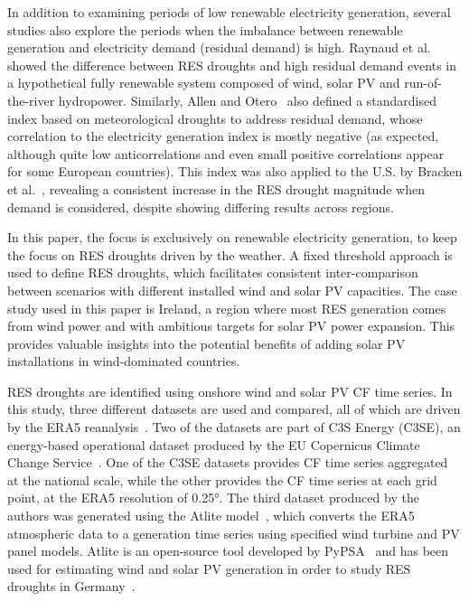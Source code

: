 \documentclass[preprint, 12pt]{elsarticle}
\begin{document}
In addition to examining periods of low renewable electricity generation, several studies also explore the periods when the imbalance between renewable generation and electricity demand (residual demand) is high. Raynaud et al.~\citep{raynaud2018drought} showed the difference between RES droughts and high residual demand events in a hypothetical fully renewable system composed of wind, solar PV and run-of-the-river hydropower. Similarly, Allen and Otero~\citep{allen2023drought} also defined a standardised index based on meteorological droughts to address residual demand, whose correlation to the electricity generation index is mostly negative (as expected, although quite low anticorrelations and even small positive correlations appear for some European countries). This index was also applied to the U.S. by Bracken et al.~\citep{bracken2024drought}, revealing a consistent increase in the RES drought magnitude when demand is considered, despite showing differing results across regions.

In this paper, the focus is exclusively on renewable electricity generation, to keep the focus on RES droughts driven by the weather. A fixed threshold approach is used to define RES droughts, which facilitates consistent inter-comparison between scenarios with different installed wind and solar PV capacities.  The case study used in this paper is Ireland, a region where most RES generation comes from wind power and with ambitious targets for solar PV power expansion. This provides valuable insights into the potential benefits of adding solar PV installations in wind-dominated countries.

RES droughts are identified using onshore wind and solar PV CF time series. In this study, three different datasets are used and compared, all of which are driven by the ERA5 reanalysis~\citep{hersbach2020era5}. Two of the datasets are part of C3S Energy (C3SE), an energy-based operational dataset produced by the EU Copernicus Climate Change Service~\citep{dubus2023energy}. One of the C3SE datasets provides CF time series aggregated at the national scale, while the other provides the CF time series at each grid point, at the ERA5 resolution of 0.25°. The third dataset produced by the authors was generated using the Atlite model~\citep{hofman2021atlite}, which converts the ERA5 atmospheric data to a generation time series using specified wind turbine and PV panel models. Atlite is an open-source tool developed by PyPSA~\citep{hofman2021atlite} and has been used for estimating wind and solar PV generation in order to study RES droughts in Germany~\citep{mockert2023drought}.
\end{document}
